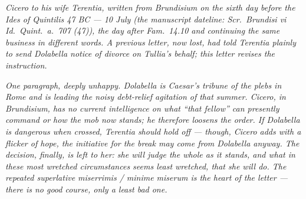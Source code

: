 
\textit{Cicero to his wife Terentia, written from
Brundisium on the sixth day before the Ides of
Quintilis 47 BC --- 10 July (the manuscript dateline:
\textit{Scr.\ Brundisi vi Id.\ Quint.\ a.\ 707 (47)}),
the day after Fam.\ 14.10 and continuing the same
business in different words. A previous letter, now
lost, had told Terentia plainly to send Dolabella
notice of divorce on Tullia's behalf; this letter
revises the instruction.}

\textit{One paragraph, deeply unhappy. Dolabella is
Caesar's tribune of the plebs in Rome and is leading
the noisy debt-relief agitation of that summer.
Cicero, in Brundisium, has no current intelligence on
what ``that fellow'' can presently command or how the
mob now stands; he therefore loosens the order. If
Dolabella is dangerous when crossed, Terentia should
hold off --- though, Cicero adds with a flicker of
hope, the initiative for the break may come from
Dolabella anyway. The decision, finally, is left to
her: she will judge the whole as it stands, and what
in these most wretched circumstances seems least
wretched, that she will do. The repeated superlative
\textit{miserrimis / minime miserum} is the heart of
the letter --- there is no good course, only a least
bad one.}
